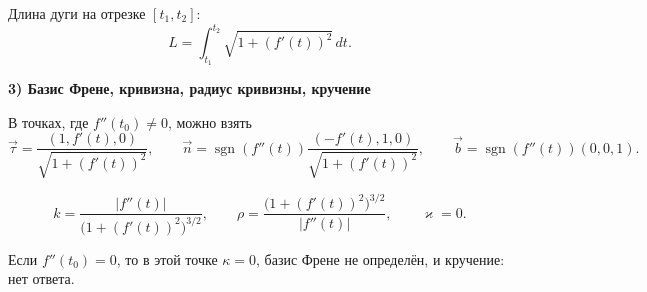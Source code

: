 \documentclass[12pt,a4paper]{article}
\begin{document}
Длина дуги на отрезке $[t_1,t_2]$:
\[
L = \int_{t_1}^{t_2} \sqrt{1 + (f'(t))^2}\,dt.
\]

\textbf{3) Базис Френе, кривизна, радиус кривизны, кручение}

В точках, где $f''(t_0) \neq 0$, можно взять
\[
\vec{\tau} = \frac{(1, f'(t), 0)}{\sqrt{1+(f'(t))^2}},
\qquad
\vec{n} = \operatorname{sgn}(f''(t)) \frac{(-f'(t), 1, 0)}{\sqrt{1+(f'(t))^2}},
\qquad
\vec{b} = \operatorname{sgn}(f''(t))(0,0,1).
\]

\[
k = \frac{|f''(t)|}{\bigl(1 + (f'(t))^2\bigr)^{3/2}}, \qquad
\rho = \frac{\bigl(1 + (f'(t))^2\bigr)^{3/2}}{|f''(t)|}, \qquad
\varkappa = 0.
\]

Если $f''(t_0)=0$, то в этой точке $\kappa=0$, базис Френе не определён, и кручение: нет ответа.
\end{document}
